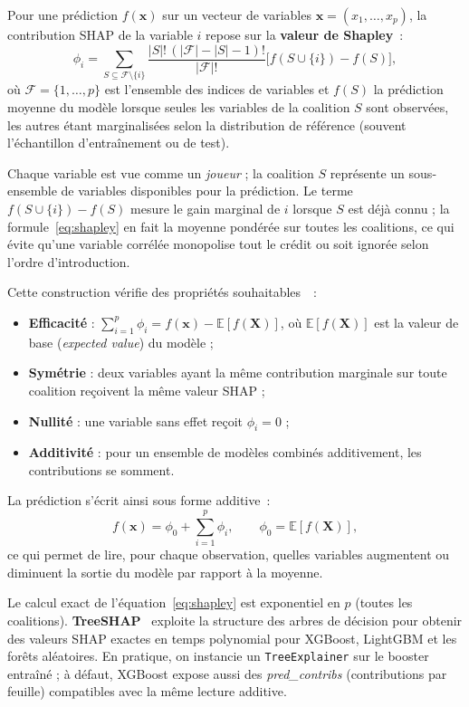 Pour une pr\'ediction $f(\mathbf{x})$ sur un vecteur de variables $\mathbf{x} = (x_1,\ldots,x_p)$, la contribution SHAP de la variable $i$ repose sur la \textbf{valeur de Shapley}~:
\begin{equation}
    \phi_i = \sum_{S \subseteq \mathcal{F} \setminus \{i\}}
    \frac{|S|!\,(|\mathcal{F}|-|S|-1)!}{|\mathcal{F}|!}
    \bigl[f(S \cup \{i\}) - f(S)\bigr],
    \label{eq:shapley}
\end{equation}
o\`u $\mathcal{F} = \{1,\ldots,p\}$ est l'ensemble des indices de variables et $f(S)$ la pr\'ediction moyenne du mod\`ele lorsque seules les variables de la coalition $S$ sont observ\'ees, les autres \'etant marginalis\'ees selon la distribution de r\'ef\'erence (souvent l'\'echantillon d'entra\^inement ou de test).

Chaque variable est vue comme un \emph{joueur} ; la coalition $S$ repr\'esente un sous-ensemble de variables disponibles pour la pr\'ediction.
Le terme $f(S \cup \{i\}) - f(S)$ mesure le gain marginal de $i$ lorsque $S$ est d\'ej\`a connu ; la formule~\eqref{eq:shapley} en fait la moyenne pond\'er\'ee sur toutes les coalitions, ce qui \'evite qu'une variable corr\'el\'ee monopolise tout le cr\'edit ou soit ignor\'ee selon l'ordre d'introduction.

Cette construction v\'erifie des propri\'et\'es souhaitables~\cite{lundberg2017shap}~:
\begin{itemize}
    \item \textbf{Efficacit\'e} : $\sum_{i=1}^{p} \phi_i = f(\mathbf{x}) - \mathbb{E}[f(\mathbf{X})]$, o\`u $\mathbb{E}[f(\mathbf{X})]$ est la valeur de base (\emph{expected value}) du mod\`ele ;
    \item \textbf{Sym\'etrie} : deux variables ayant la m\^eme contribution marginale sur toute coalition re\c{c}oivent la m\^eme valeur SHAP ;
    \item \textbf{Nullit\'e} : une variable sans effet re\c{c}oit $\phi_i = 0$ ;
    \item \textbf{Additivit\'e} : pour un ensemble de mod\`eles combin\'es additivement, les contributions se somment.
\end{itemize}

La pr\'ediction s'\'ecrit ainsi sous forme additive~:
\[
f(\mathbf{x}) = \phi_0 + \sum_{i=1}^{p} \phi_i,
\qquad
\phi_0 = \mathbb{E}[f(\mathbf{X})],
\]
ce qui permet de lire, pour chaque observation, quelles variables augmentent ou diminuent la sortie du mod\`ele par rapport \`a la moyenne.

Le calcul exact de l'\'equation~\eqref{eq:shapley} est exponentiel en $p$ (toutes les coalitions).
\textbf{TreeSHAP}~\cite{lundberg2017shap} exploite la structure des arbres de d\'ecision pour obtenir des valeurs SHAP exactes en temps polynomial pour XGBoost, LightGBM et les for\^ets al\'eatoires.
En pratique, on instancie un \texttt{TreeExplainer} sur le booster entra\^in\'e ; \`a d\'efaut, XGBoost expose aussi des \emph{pred\_contribs} (contributions par feuille) compatibles avec la m\^eme lecture additive.


